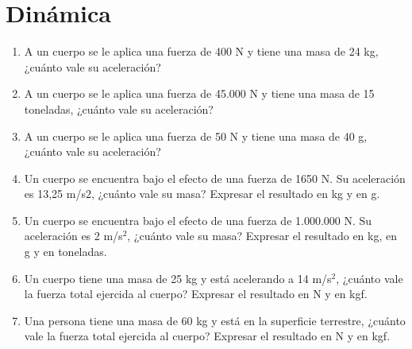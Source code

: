 \section{Dinámica}

\begin{enumerate}
\item A un cuerpo se le aplica una fuerza de 400 N y tiene una masa de 24 kg, ¿cuánto vale su aceleración?

\item A un cuerpo se le aplica una fuerza de 45.000 N y tiene una masa de 15 toneladas, ¿cuánto vale su aceleración?

\item A un cuerpo se le aplica una fuerza de 50 N y tiene una masa de 40 g, ¿cuánto vale su aceleración?

\item Un cuerpo se encuentra bajo el efecto de una fuerza de 1650 N. Su aceleración es 13,25 m/s$2$, ¿cuánto vale su masa? Expresar el resultado en kg y en g. %

\item Un cuerpo se encuentra bajo el efecto de una fuerza de 1.000.000 N. Su aceleración es 2 m/s$^2$, ¿cuánto vale su masa? Expresar el resultado en kg, en g y en toneladas. %

\item Un cuerpo tiene una masa de 25 kg y está acelerando a 14 m/s$^2$, ¿cuánto vale la fuerza total ejercida al cuerpo? Expresar el resultado en N y en kgf. %


\item Una persona tiene una masa de 60 kg y está en la superficie terrestre, ¿cuánto vale la fuerza total ejercida al cuerpo? Expresar el resultado en N y en kgf. %

\end{enumerate}